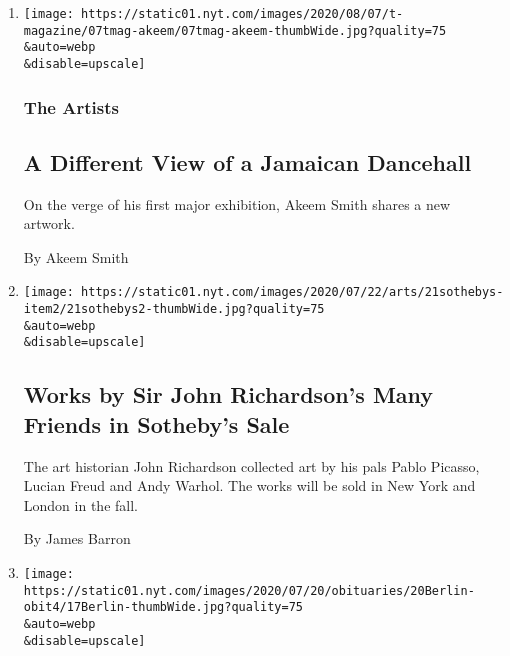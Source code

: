 \begin{enumerate}
\def\labelenumi{\arabic{enumi}.}
\item
  \href{/2020/08/07/t-magazine/akeem-smith-art.html}{}

  \texttt{[image: https://static01.nyt.com/images/2020/08/07/t-magazine/07tmag-akeem/07tmag-akeem-thumbWide.jpg?quality=75\\\&auto=webp\\\&disable=upscale]}

  \hypertarget{the-artists}{%
  \subsubsection{The Artists}\label{the-artists}}

  \hypertarget{a-different-view-of-a-jamaican-dancehall}{%
  \subsection{A Different View of a Jamaican
  Dancehall}\label{a-different-view-of-a-jamaican-dancehall}}

  On the verge of his first major exhibition, Akeem Smith shares a new
  artwork.

  By Akeem Smith
\item
  \href{/2020/07/21/arts/design/sothebys-john-richardson-freud.html}{}

  \texttt{[image: https://static01.nyt.com/images/2020/07/22/arts/21sothebys-item2/21sothebys2-thumbWide.jpg?quality=75\\\&auto=webp\\\&disable=upscale]}

  \hypertarget{works-by-sir-john-richardsons-many-friends-in-sothebys-sale}{%
  \subsection{Works by Sir John Richardson's Many Friends in Sotheby's
  Sale}\label{works-by-sir-john-richardsons-many-friends-in-sothebys-sale}}

  The art historian John Richardson collected art by his pals Pablo
  Picasso, Lucian Freud and Andy Warhol. The works will be sold in New
  York and London in the fall.

  By James Barron
\item
  \href{/2020/07/18/arts/brigid-berlin-dead.html}{}

  \texttt{[image: https://static01.nyt.com/images/2020/07/20/obituaries/20Berlin-obit4/17Berlin-thumbWide.jpg?quality=75\\\&auto=webp\\\&disable=upscale]}

  \hypertarget{brigid-berlin-socialite-who-joined-warhols-world-dies-at-80}{%
}
\end{enumerate}
